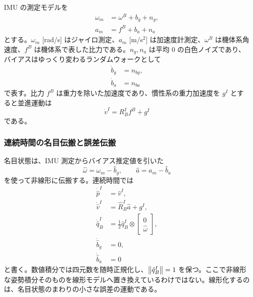 IMU の測定モデルを
\begin{align}
  \omega_m&=\omega^B+b_g+n_g,\\
  a_m&=f^B+b_a+n_a
\end{align}
とする。$\omega_m$ [rad/s] はジャイロ測定、$a_m$ [m/s$^2$] は加速度計測定、$\omega^B$ は機体系角速度、$f^B$ は機体系で表した比力である。$n_g,n_a$ は平均 0 の白色ノイズであり、バイアスはゆっくり変わるランダムウォークとして
\begin{align}
  \dot{b}_g&=n_{bg},\\
  \dot{b}_a&=n_{ba}
\end{align}
で表す。比力 $f^B$ は重力を除いた加速度であり、慣性系の重力加速度を $g^I$ とすると並進運動は
\begin{equation}
  \dot{v}^I=R^I_B f^B+g^I
\end{equation}
である。

\subsubsection{連続時間の名目伝搬と誤差伝搬}

名目状態は、IMU 測定からバイアス推定値を引いた
\begin{equation}
  \hat{\omega}=\omega_m-\hat{b}_g,
  \qquad
  \hat{a}=a_m-\hat{b}_a
\end{equation}
を使って非線形に伝搬する。連続時間では
\begin{align}
  \dot{\hat{p}}^I&=\hat{v}^I,\\
  \dot{\hat{v}}^I&=\hat{R}^I_B\hat{a}+g^I,\\
  \dot{\hat{q}}^I_B
  &=
  \frac{1}{2}\hat{q}^I_B\otimes
  \begin{bmatrix}
    0\\ \hat{\omega}
  \end{bmatrix},\\
  \dot{\hat{b}}_g&=0,\\
  \dot{\hat{b}}_a&=0
\end{align}
と書く。数値積分では四元数を随時正規化し、$\left\|\hat{q}^I_B\right\|=1$ を保つ。ここで非線形な姿勢積分そのものを線形モデルへ置き換えているわけではない。線形化するのは、名目状態のまわりの小さな誤差の運動である。

